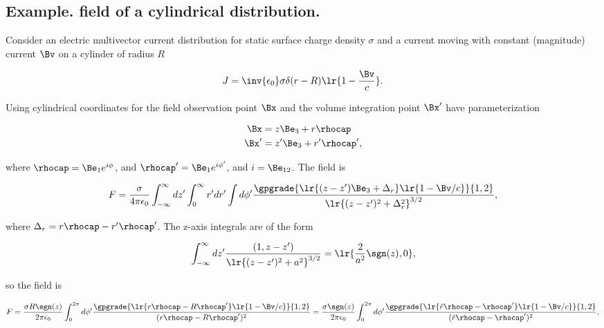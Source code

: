 %
%
\subsection{Example.  field of a cylindrical distribution.}

Consider an electric multivector current distribution for static surface charge density \( \sigma \) and a current moving with constant (magnitude) current \( \Bv \) on a cylinder of radius \( R \)

\begin{dmath}\label{eqn:cylinderField:20}
J = \inv{\epsilon_0} \sigma \delta( r - R ) \lr{ 1 - \frac{\Bv}{c} }.
\end{dmath}

Using cylindrical coordinates for the field observation point \( \Bx \) and the volume integration point \( \Bx' \) have parameterization

\begin{dmath}\label{eqn:cylinderField:40}
\begin{aligned}
\Bx &= z \Be_3 + r \rhocap \\
\Bx' &= z' \Be_3 + r' \rhocap',
\end{aligned}
\end{dmath}

where \( \rhocap = \Be_1 e^{i \phi} \), and \( \rhocap' = \Be_1 e^{i \phi'} \), and \( i = \Be_{12} \).
The field is

\begin{dmath}\label{eqn:cylinderField:60}
F = \frac{\sigma}{4 \pi \epsilon_0}
\int_{-\infty}^\infty dz' \int_0^\infty r' dr' \int d\phi' \frac{
   \gpgrade{ \lr{ (z-z') \Be_3 + \Delta_r }\lr{ 1 - \Bv/c }  }{1,2}
}{ \lr{ (z -z')^2 + \Delta_r^2 }^{3/2} },
\end{dmath}

where \( \Delta_r = r \rhocap - r' \rhocap' \).
The z-axis integrals are of the form

\begin{dmath}\label{eqn:cylinderField:80}
\int_{-\infty}^\infty dz' \frac{ (1, z-z') }{ \lr{(z-z')^2 + a^2 }^{3/2}}
=
\lr{ \frac{2}{a^2} \sgn(z), 0 },
\end{dmath}

so the field is

\begin{dmath}\label{eqn:cylinderField:100}
F
=
\frac{\sigma R \sgn(z)}{2 \pi \epsilon_0}
\int_0^{2 \pi} d\phi' \frac{
   \gpgrade{ \lr{ r\rhocap - R \rhocap' } \lr{ 1 - \Bv/c } }{1,2}
}
{ (r\rhocap - R \rhocap')^2 }
=
\frac{\sigma \sgn(z)}{2 \pi \epsilon_0}
\int_0^{2 \pi} d\phi' \frac{
   \gpgrade{ \lr{ \tilde{r}\rhocap - \rhocap' } \lr{ 1 - \Bv/c } }{1,2}
}
{ (\tilde{r}\rhocap - \rhocap')^2 },
\end{dmath}

